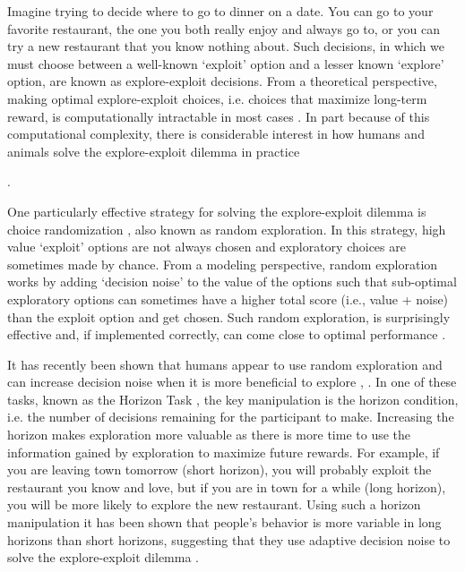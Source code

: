 \documentclass[12pt]{article}
\begin{document}
	Imagine trying to decide where to go to dinner on a date. You can go to your favorite restaurant, the one you both really enjoy and always go to, or you can try a new restaurant that you know nothing about. Such decisions, in which we must choose between a well-known `exploit' option and a lesser known `explore' option, are known as explore-exploit decisions.  From a theoretical perspective, making optimal explore-exploit choices, i.e. choices that maximize long-term reward, is computationally intractable in most cases \citep{eegittins74, eeBasu18}. In part because of this computational complexity, there is considerable interest in how humans and animals solve the explore-exploit dilemma in practice {\citep{Mehlhorn15, SCHULZ20197,WILSON202149}.
	
	One particularly effective strategy for solving the explore-exploit dilemma is choice randomization \citep{eethompson33, eewatkins89, eebridle90}, also known as random exploration. In this strategy, high value `exploit' options are not always chosen and exploratory choices are sometimes made by chance. From a modeling perspective, random exploration works by adding `decision noise' to the value of the options such that sub-optimal exploratory options can sometimes have a higher total score (i.e., value + noise) than the exploit option and get chosen. Such random exploration, is surprisingly effective and, if implemented correctly, can come close to optimal performance \citep{eethompson33, eebridle90, eeAgrawal11, eeChapelle11}.
	
	It has recently been shown that humans appear to use random exploration and can increase decision noise when it is more beneficial to explore \citep{Gershman2018, wilson2014}, . In one of these tasks, known as the Horizon Task \citep{wilson2014}, the key manipulation is the horizon condition, i.e. the number of decisions remaining for the participant to make. Increasing the horizon makes exploration more valuable as there is more time to use the information gained by exploration to maximize future rewards. For example, if you are leaving town tomorrow (short horizon), you will probably exploit the restaurant you know and love, but if you are in town for a while (long horizon), you will be more likely to explore the new restaurant. Using such a horizon manipulation it has been shown that people's behavior is more variable in long horizons than short horizons, suggesting that they use adaptive decision noise to solve the explore-exploit dilemma \citep{wilson2014}. 

}
\end{document}
